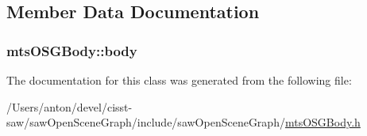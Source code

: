 \subsection{Member Data Documentation}
\hypertarget{classmts_o_s_g_body_ae3a847023812fbfa11686c769d97f34e}{}
\subsubsection[{body}]{ mts\+O\+S\+G\+Body\+::body\hspace{0.3cm}{\ttfamily [protected]}}\label{classmts_o_s_g_body_ae3a847023812fbfa11686c769d97f34e}


The documentation for this class was generated from the following file\+:\begin{DoxyCompactItemize}
\item 
/\+Users/anton/devel/cisst-\/saw/saw\+Open\+Scene\+Graph/include/saw\+Open\+Scene\+Graph/\hyperlink{mts_o_s_g_body_8h}{mts\+O\+S\+G\+Body.\+h}\end{DoxyCompactItemize}
